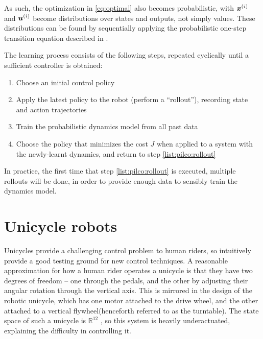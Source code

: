 \documentclass[main.tex]{subfiles}
\begin{document}
	As such, the optimization in \cref{eq:optimal} also becomes probabilistic\footnotemark, with $\bm{x}^{(i)}$ and $\bm{u}^{(i)}$ become distributions over states and outputs, not simply values. These distributions can be found by sequentially applying the probabilistic one-step transition equation described in \label{eq:transition-gp}.


	The learning process consists of the following steps, repeated cyclically until a sufficient controller is obtained:
	\begin{enumerate}[nosep]
		\item Choose an initial control policy
		\item Apply the latest policy to the robot (perform a \enquote{rollout}), recording state and action trajectories \label{list:pilco:rollout}
		\item Train the probabilistic dynamics model from all past data
		\item Choose the policy that minimizes the cost $J$ when applied to a system with the newly-learnt dynamics, and return to step \ref{list:pilco:rollout}
	\end{enumerate}
	In practice, the first time that step \ref{list:pilco:rollout} is executed, multiple rollouts will be done, in order to provide enough data to sensibly train the dynamics model.

\section{Unicycle robots}

	Unicycles provide a challenging control problem to human riders, so intuitively provide a good testing ground for new control techniques.
	A reasonable approximation for how a human rider operates a unicycle is that they have two degrees of freedom -- one through the pedals, and the other by adjusting their angular rotation through the vertical axis.
	This is mirrored in the design of the robotic unicycle, which has one motor attached to the drive wheel, and the other attached to a vertical flywheel\footnotemark (henceforth referred to as the turntable).
	The state space of such a unicycle is $\mathbb{R}^{12}$ \cite{forster}, so this system is heavily underactuated, explaining the difficulty in controlling it.
\end{document}
